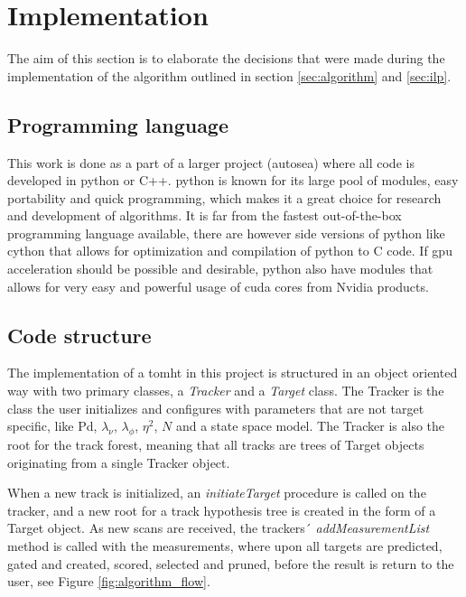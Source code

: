 \section{Implementation}
\label{sec:implementation}
The aim of this section is to elaborate the decisions that were made during the implementation of the algorithm outlined in section \ref{sec:algorithm} and \ref{sec:ilp}.

\subsection{Programming language}
This work is done as a part of a larger project (\gls{autosea}) where all code is developed in \gls{python} or C++. \Gls{python} is known for its large pool of modules, easy portability and quick programming, which makes it a great choice for research and development of algorithms. It is far from the fastest out-of-the-box programming language available, there are however side versions of \gls{python} like \gls{cython} that allows for optimization and compilation of \gls{python} to C code. If \gls{gpu} acceleration should be possible and desirable, \gls{python} also have modules that allows for very easy and powerful usage of \gls{cuda} cores from Nvidia products.


\subsection{Code structure}
The implementation of a \gls{tomht} in this project is structured in an object oriented way with two primary classes, a \emph{Tracker} and a \emph{Target} class. The Tracker is the class the user initializes and configures with parameters that are not target specific, like \gls{Pd}, $\lambda_\nu$, $\lambda_\phi$, $\eta^2$, $N$ and a state space model. The Tracker is also the root for the track forest, meaning that all tracks are trees of Target objects originating from a single Tracker object.

When a new track is initialized, an \emph{initiateTarget} procedure is called on the tracker, and a new root for a \gls{track hypothesis tree} is created in the form of a Target object. As new \glspl{scan} are received, the trackers´ \emph{addMeasurementList} method is called with the measurements, where upon all \glspl{target} are predicted, gated and created, scored, selected and pruned, before the result is return to the user, see Figure \ref{fig:algorithm_flow}.

